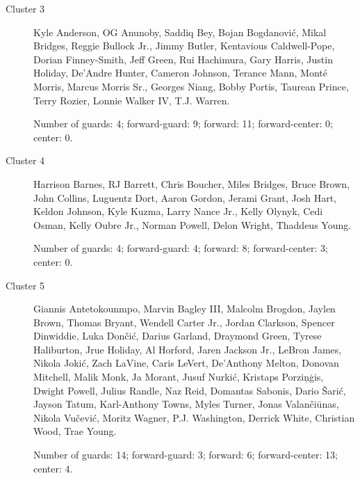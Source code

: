 \begin{description}
	\item[Cluster 3] Kyle Anderson, OG Anunoby, Saddiq Bey, Bojan Bogdanović, Mikal Bridges, Reggie Bullock Jr., Jimmy Butler, Kentavious Caldwell-Pope, Dorian Finney-Smith, Jeff Green, Rui Hachimura, Gary Harris, Justin Holiday, De'Andre Hunter, Cameron Johnson, Terance Mann, Monté Morris, Marcus Morris Sr., Georges Niang, Bobby Portis, Taurean Prince, Terry Rozier, Lonnie Walker IV, T.J. Warren.

	      Number of guards: 4; forward-guard: 9; forward: 11; forward-center: 0; center: 0.

	\item[Cluster 4]  Harrison Barnes, RJ Barrett, Chris Boucher, Miles Bridges, Bruce Brown, John Collins, Luguentz Dort, Aaron Gordon, Jerami Grant, Josh Hart, Keldon Johnson, Kyle Kuzma, Larry Nance Jr., Kelly Olynyk, Cedi Osman, Kelly Oubre Jr., Norman Powell, Delon Wright, Thaddeus Young.

	      Number of guards: 4; forward-guard: 4; forward: 8; forward-center: 3; center: 0.

	\item[Cluster 5]  Giannis Antetokounmpo, Marvin Bagley III, Malcolm Brogdon, Jaylen Brown, Thomas Bryant, Wendell Carter Jr., Jordan Clarkson, Spencer Dinwiddie, Luka Dončić, Darius Garland, Draymond Green, Tyrese Haliburton, Jrue Holiday, Al Horford, Jaren Jackson Jr., LeBron James, Nikola Jokić, Zach LaVine, Caris LeVert, De'Anthony Melton, Donovan Mitchell, Malik Monk, Ja Morant, Jusuf Nurkić, Kristaps Porziņģis, Dwight Powell, Julius Randle, Naz Reid, Domantas Sabonis, Dario Šarić, Jayson Tatum, Karl-Anthony Towns, Myles Turner, Jonas Valančiūnas, Nikola Vučević, Moritz Wagner, P.J. Washington, Derrick White, Christian Wood, Trae Young.

	      Number of guards: 14; forward-guard: 3; forward: 6; forward-center: 13; center: 4.

\end{description}


